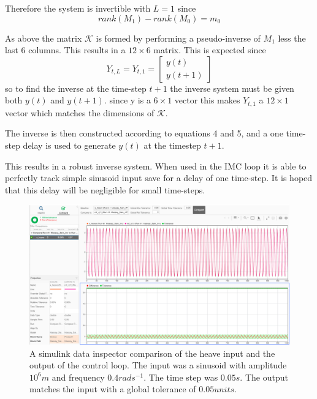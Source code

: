 \documentclass{article}
\begin{document}
Therefore the system is invertible with $L=1$ since
\[
rank(M_1) - rank(M_0) = m_0
\]

As above the matrix $\mathcal{K}$ is formed by performing a pseudo-inverse of $M_1$ less the last 6 columns. This results in a $12\times6$ matrix. This is expected since
\[
Y_{t,L} = Y_{t,1} =
\begin{bmatrix}
y(t)	\\
y(t+1)
\end{bmatrix}
\]
so to find the inverse at the time-step $t+1$ the inverse system must be given both $y(t)$ and $y(t+1)$. since y is a $6\times1$ vector this makes $Y_{t,1}$ a $12\times1$ vector which matches the dimensions of $\mathcal{K}$.

The inverse is then constructed according to equations 4 and 5, and a one time-step delay is used to generate $y(t)$ at the timestep $t+1$.

This results in a robust inverse system. When used in the IMC loop it is able to perfectly track simple sinusoid input save for a delay of one time-step. It is hoped that this delay will be negligible for small time-steps.

\begin{figure}
	\centering
	\includegraphics[scale=0.55]{heaveTracking}
	\caption{A simulink data inspector comparison of the heave input and the output of the control loop. The input was a sinusoid with amplitude $10^6m$ and frequency $0.4rads^{-1}$. The time step was $0.05s$. The output matches the input with a global tolerance of $0.05 units$.}
\end{figure}
\end{document}
